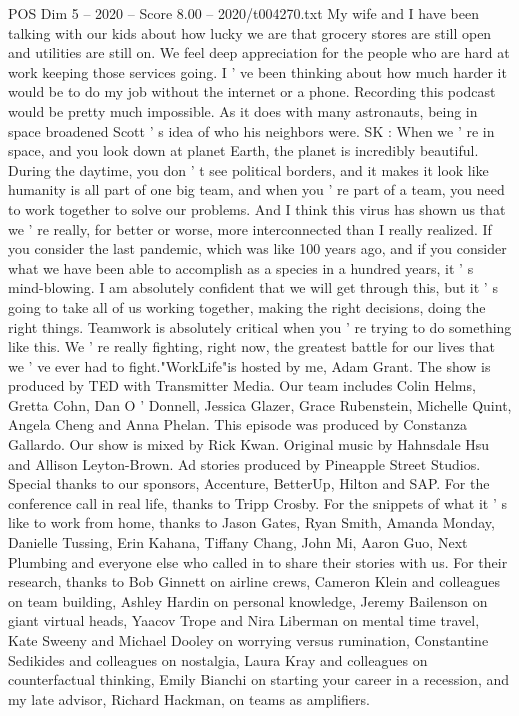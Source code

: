 \begin{textsample}{POS Dim 5 – 2020 – Score 8.00 – 2020/t004270.txt}
My wife and I have been talking with our kids about how lucky we are that grocery stores are still open and utilities are still on.
We feel deep appreciation for the people who are hard at work keeping those services going.
I ' ve been thinking about how much harder it would be to do my job without the internet or a phone.
Recording this podcast would be pretty much impossible.
As it does with many astronauts, being in space broadened Scott ' s idea of who his neighbors were.
SK : When we ' re in space, and you look down at planet Earth, the planet is incredibly beautiful.
During the daytime, you don ' t see political borders, and it makes it look like humanity is all part of one big team, and when you ' re part of a team, you need to work together to solve our problems.
And I think this virus has shown us that we ' re really, for better or worse, more interconnected than I really realized.
If you consider the last pandemic, which was like 100 years ago, and if you consider what we have been able to accomplish as a species in a hundred years, it ' s mind-blowing.
I am absolutely confident that we will get through this, but it ' s going to take all of us working together, making the right decisions, doing the right things.
Teamwork is absolutely critical when you ' re trying to do something like this.
We ' re really fighting, right now, the greatest battle for our lives that we ' ve ever had to fight."WorkLife"is hosted by me, Adam Grant.
The show is produced by TED with Transmitter Media.
Our team includes Colin Helms, Gretta Cohn, Dan O ' Donnell, Jessica Glazer, Grace Rubenstein, Michelle Quint, Angela Cheng and Anna Phelan.
This episode was produced by Constanza Gallardo.
Our show is mixed by Rick Kwan.
Original music by Hahnsdale Hsu and Allison Leyton-Brown.
Ad stories produced by Pineapple Street Studios.
Special thanks to our sponsors, Accenture, BetterUp, Hilton and SAP.
For the conference call in real life, thanks to Tripp Crosby.
For the snippets of what it ' s like to work from home, thanks to Jason Gates, Ryan Smith, Amanda Monday, Danielle Tussing, Erin Kahana, Tiffany Chang, John Mi, Aaron Guo, Next Plumbing and everyone else who called in to share their stories with us.
For their research, thanks to Bob Ginnett on airline crews, Cameron Klein and colleagues on team building, Ashley Hardin on personal knowledge, Jeremy Bailenson on giant virtual heads, Yaacov Trope and Nira Liberman on mental time travel, Kate Sweeny and Michael Dooley on worrying versus rumination, Constantine Sedikides and colleagues on nostalgia, Laura Kray and colleagues on counterfactual thinking, Emily Bianchi on starting your career in a recession, and my late advisor, Richard Hackman, on teams as amplifiers.

\end{textsample}
